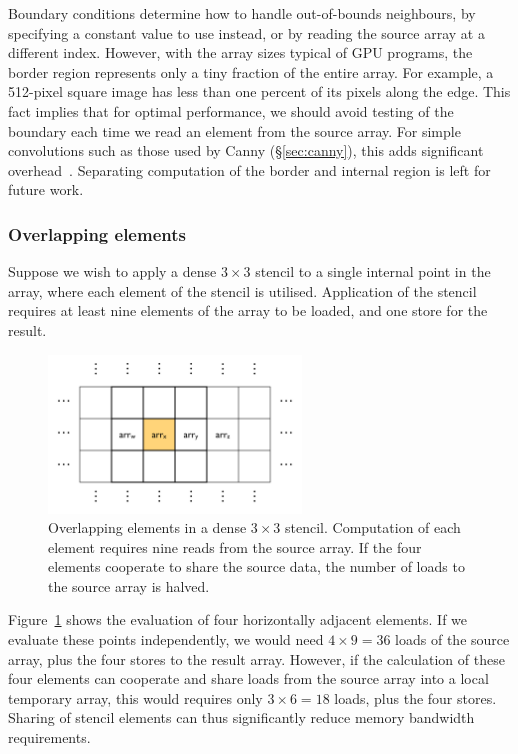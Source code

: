 Boundary conditions determine how to handle out-of-bounds neighbours, by
specifying a constant value to use instead, or by reading the source array at a
different index. However, with the array sizes typical of GPU programs, the
border region represents only a tiny fraction of the entire array. For example,
a 512-pixel square image has less than one percent of its pixels along the edge.
This fact implies that for optimal performance, we should avoid testing of the
boundary each time we read an element from the source array. For simple
convolutions such as those used by Canny (\S\ref{sec:canny}), this adds
significant overhead~\cite{Lippmeier:2011cd}. Separating computation of the
border and internal region is left for future work.


\subsubsection{Overlapping elements}

Suppose we wish to apply a dense $3\times3$ stencil to a single internal point
in the array, where each element of the stencil is utilised. Application of the
stencil requires at least nine elements of the array to be loaded, and one store
for the result.

\begin{figure}[tbp]
    \begin{center}
        \includegraphics[width=0.6\textwidth]{images/sec-4/stencil-sharing}
    \end{center}
    \caption[Overlapping elements in a $3\times3$ stencil]{
        Overlapping elements in a dense $3\times3$ stencil. Computation of each
        element requires nine reads from the source array. If the four elements
        cooperate to share the source data, the number of loads to the source
        array is halved.}
    \label{fig:stencil_sharing}
\end{figure}

Figure~\ref{fig:stencil_sharing} shows the evaluation of four horizontally
adjacent elements. If we evaluate these points independently, we would need
$4 \times 9 = 36$ loads of the source array, plus the four stores to the result
array. However, if the calculation of these four elements can cooperate and
share loads from the source array into a local temporary array, this would
requires only $3 \times 6 = 18$ loads, plus the four stores. Sharing of stencil
elements can thus significantly reduce memory bandwidth requirements.

